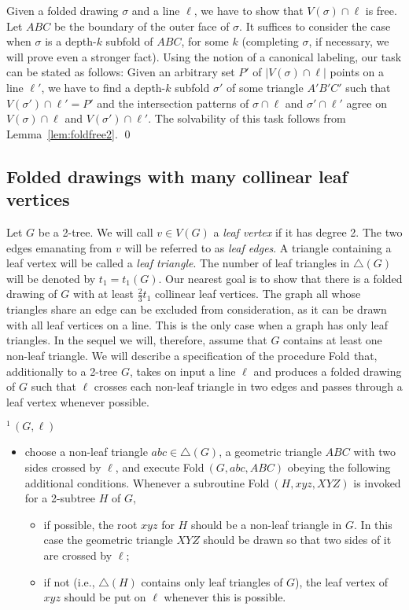 \documentclass[reqno,12pt]{amsart}
\newcommand{\shift}{\mbox{}\hspace{4.5mm}}
\newcommand{\foldn}[1]{{\sc Fold}$^{#1}$}
\newcommand{\fold}[2]{{\sc Fold}$^{#1}\,(#2)$}
\newenvironment{proofof}[1]{\par\smallbreak\noindent{\it Proof~of~#1.}}{\unskip\nobreak\hfill \qed \par\medbreak}
\begin{document}
\begin{proofof}{Lemma \ref{lem:foldfree}}
Given a folded drawing $\sigma$ and a line $\ell$, we have to show that
$V(\sigma)\cap\ell$ is free. Let $ABC$ be the boundary of the outer face of $\sigma$.
It suffices to consider the case when $\sigma$ is a depth-$k$ subfold of $ABC$,
for some $k$ (completing $\sigma$, if necessary, we will prove even a stronger fact).
Using the notion of a canonical labeling, our task can be stated as follows:
Given an arbitrary set $P'$ of $|V(\sigma)\cap\ell|$ points on a line $\ell'$,
we have to find a depth-$k$ subfold $\sigma'$ of some triangle $A'B'C'$
such that $V(\sigma')\cap\ell'=P'$ and the intersection patterns of $\sigma\cap\ell$
and $\sigma'\cap\ell'$ agree on $V(\sigma)\cap\ell$ and $V(\sigma')\cap\ell'$.
The solvability of this task follows from Lemma~\ref{lem:foldfree2}.
\end{proofof}


\subsection{Folded drawings with many collinear leaf vertices}\label{ss:fold1}

Let $G$ be a 2-tree. We will call $v\in V(G)$ a \emph{leaf vertex} 
if it has degree 2. The two edges emanating from $v$ will be referred to
as \emph{leaf edges}.
A triangle containing a leaf vertex will be called a \emph{leaf triangle}. 
The number of leaf triangles in $\triangle(G)$ 
will be denoted by $t_1=t_1(G)$. 
Our nearest goal is to show that there is a folded drawing of $G$
with at least $\frac23t_1$ collinear leaf vertices.
The graph all whose triangles share an edge can be excluded from
consideration, as it can be drawn with all leaf vertices on a line.
This is the only case when a graph has only leaf triangles.
In the sequel we will, therefore, assume that $G$ contains at least one non-leaf triangle.
We will describe a specification of the procedure \foldn{}
that, additionally to a 2-tree $G$, takes on input a line $\ell$
and produces a folded drawing of $G$ such that $\ell$ crosses
each non-leaf triangle in two edges and passes through a leaf vertex
whenever possible.

\bigskip

\shift\fold1{G,\ell}\\[-7mm]
\begin{itemize}
\item
choose a non-leaf triangle $abc\in\triangle(G)$, a geometric triangle
$ABC$ with two sides crossed by $\ell$, and execute \fold{}{G,abc,ABC}
obeying the following additional conditions.
Whenever a subroutine \fold{}{H,xyz,XYZ} is invoked for a 2-subtree $H$ of $G$,
\begin{itemize}
\item
if possible,
the root $xyz$ for $H$ should be a non-leaf triangle in $G$.
In this case the geometric triangle $XYZ$ should be drawn so that two sides of it
are crossed by $\ell$;
\item
if not (i.e., $\triangle(H)$ contains only leaf triangles of $G$),
the leaf vertex of $xyz$ should be put on $\ell$ whenever this is possible.
\end{itemize}
\end{itemize}
\end{document}

